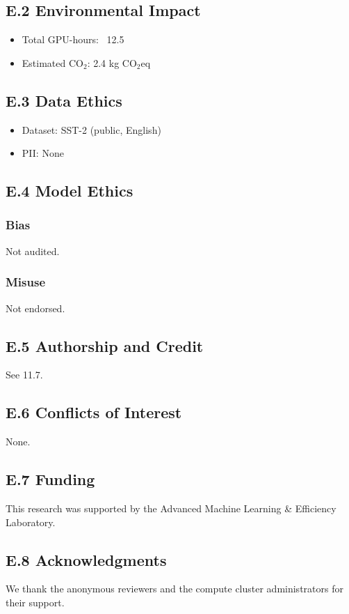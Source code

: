 \subsection{E.2 Environmental Impact}

\begin{itemize}
\item Total GPU-hours: ~12.5
\item Estimated CO$_2$: 2.4 kg CO$_2$eq

\end{itemize}
\subsection{E.3 Data Ethics}

\begin{itemize}
\item Dataset: SST-2 (public, English)
\item PII: None

\end{itemize}
\subsection{E.4 Model Ethics}

\subsubsection{Bias}
Not audited.

\subsubsection{Misuse}
Not endorsed.

\subsection{E.5 Authorship and Credit}
See  11.7.

\subsection{E.6 Conflicts of Interest}
None.

\subsection{E.7 Funding}
This research was supported by the Advanced Machine Learning \& Efficiency Laboratory.

\subsection{E.8 Acknowledgments}
We thank the anonymous reviewers and the compute cluster administrators for their support.

